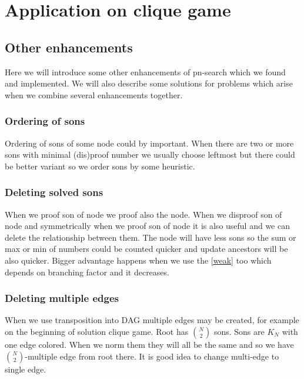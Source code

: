 \chapter{Application on clique game}


\section{Other enhancements}
Here we will introduce some other enhancements of pn-search which we found and
implemented. We will also describe some solutions for problems which arise 
when we combine several enhancements together. 

\subsection{Ordering of sons} \label{ord}

Ordering of sons of some node could by important. When there are two or more
sons with minimal (dis)proof number we usually choose leftmost but there could
be better variant so we order sons by some heuristic.

\subsection{Deleting solved sons}

When we proof son of  node we proof also the node. When we disproof
son of  node and symmetrically when we proof son of  node it
is also useful and we can delete the relationship between them. The node will
have less sons so the sum or max or min of numbers could be counted quicker and
update ancestors will be also quicker. Bigger advantage happens when we use the
 \ref{weak} too which depends on branching factor and it decreases.

\subsection{Deleting multiple edges }

When we use transposition into DAG multiple edges may be created, for example
on the beginning of solution clique game. Root has $N \choose 2$ sons. Sons are
$K_N$ with one edge colored. When we norm them they will all be the same and so
we have $N \choose 2$-multiple edge from root there. It is good idea to
change multi-edge to single edge.

